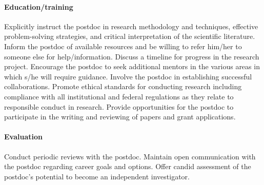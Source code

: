 \vspace{-5pt}\paragraph{Education/training}
Explicitly instruct the postdoc in research methodology and techniques,
effective problem-solving strategies, and critical interpretation of the 
scientific literature.  Inform the postdoc of available resources and be 
willing to refer him/her to someone else for help/information.
Discuss a timeline for progress in the research project.
Encourage the postdoc to seek additional mentors in the various areas
in which s/he will require guidance.
Involve the postdoc in establishing successful collaborations.
Promote ethical standards for conducting research including compliance
with all institutional and federal regulations as they relate to responsible
conduct in research.
Provide opportunities for the postdoc to participate in the writing
and reviewing of papers and grant applications.  
\vspace{-3pt}
\paragraph{Evaluation}
Conduct periodic reviews with the postdoc.
Maintain open communication with the postdoc regarding career goals
and options. %
Offer candid assessment of the postdoc's potential to become
an independent investigator.
\vspace{-3pt}

